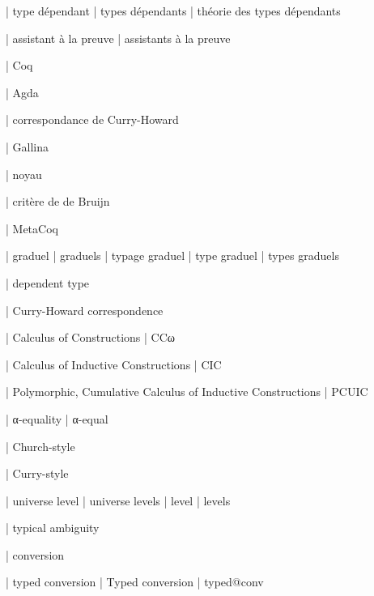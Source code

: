 




  | type dépendant
  | types dépendants
  | théorie des types dépendants

  | assistant à la preuve
  | assistants à la preuve

  | Coq

  | Agda

  | correspondance de Curry-Howard

  | Gallina

  | noyau

  | critère de de Bruijn

  | MetaCoq

  | graduel
  | graduels
  | typage graduel
  | type graduel
  | types graduels


  | dependent type

  | Curry-Howard correspondence


  | Calculus of Constructions
  | CCω

  | Calculus of Inductive Constructions
  | CIC

  | Polymorphic, Cumulative Calculus of Inductive Constructions
  | PCUIC

  | α-equality
  | α-equal 

  | Church-style

  | Curry-style

  | universe level
  | universe levels
  | level
  | levels

  | typical ambiguity

  | conversion

  | typed conversion
  | Typed conversion
  | typed@conv

